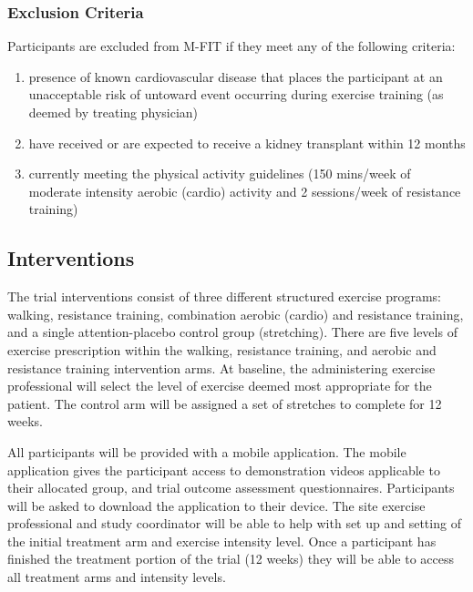 \documentclass[
]{article}
\providecommand{\tightlist}{%
  \setlength{\itemsep}{0pt}\setlength{\parskip}{0pt}}
\begin{document}
\hypertarget{exclusion-criteria}{
  \subsubsection{Exclusion Criteria}\label{exclusion-criteria}
}

Participants are excluded from M-FIT if they meet any of the following criteria:

\begin{enumerate}
  \def\labelenumi{\arabic{enumi}.}
  \tightlist
  \item presence of known cardiovascular disease that places the participant at an unacceptable risk of untoward event occurring during exercise training (as deemed by treating physician)
  \item have received or are expected to receive a kidney transplant within 12 months
  \item currently meeting the physical activity guidelines (150 mins/week of moderate intensity aerobic (cardio) activity and 2 sessions/week of resistance training)
\end{enumerate}


\hypertarget{interventions}{
  \subsection{Interventions}\label{interventions}
}

The trial interventions consist of three different structured exercise programs: walking, resistance training, combination aerobic (cardio) and resistance training, and a single attention-placebo control group (stretching).
There are five levels of exercise prescription within the walking, resistance training, and aerobic and resistance training intervention arms.
At baseline, the administering exercise professional will select the level of exercise deemed most appropriate for the patient.
The control arm will be assigned a set of stretches to complete for 12 weeks.

All participants will be provided with a mobile application.
The mobile application gives the participant access to demonstration videos applicable to their allocated group, and trial outcome assessment questionnaires.
Participants will be asked to download the application to their device.
The site exercise professional and study coordinator will be able to help with set up and setting of the initial treatment arm and exercise intensity level.
Once a participant has finished the treatment portion of the trial (12 weeks) they will be able to access all treatment arms and intensity levels.
\end{document}
